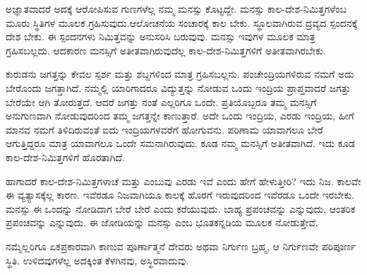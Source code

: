  ಅಜ್ಞಾತವಾದರೆ ಅದಕ್ಕೆ ಆರೋಪಿಸುವ ಗುಣಗಳೆಲ್ಲ ನಮ್ಮ ಮನಸ್ಸು ಕೊಟ್ಟದ್ದೇ. ಮನಸ್ಸು ಕಾಲ-ದೇಶ-ನಿಮಿತ್ತಗಳೆಂಬ ಮೂರು ಸ್ಥಿತಿಗಳ ಮೂಲಕ ಗ್ರಹಿಸುವುದು.\break ಆಲೋಚನೆಯ ಸಂಚಾರಕ್ಕೆ ಕಾಲ ಬೇಕು. ಸ್ಥೂಲವಾಗಿರುವ ದ್ರವ್ಯದ ಸ್ಪಂದನಕ್ಕೆ ದೇಶ ಬೇಕು. ಈ ಸ್ಪಂದನಗಳು ನಿಮಿತ್ತವನ್ನು ಅನುಸರಿಸಿ ಬರುವುವು. ಮನಸ್ಸು ಇವುಗಳ ಮೂಲಕ ಮಾತ್ರ ಗ್ರಹಿಸಬಲ್ಲದು. ಆದಕಾರಣ ಮನಸ್ಸಿಗೆ ಅತೀತವಾಗಿರುವುದೆಲ್ಲ ಕಾಲ-ದೇಶ-ನಿಮಿತ್ತಗಳಿಗೆ ಅತೀತವಾಗಿರಬೇಕು.

\newpage

ಕುರುಡನು ಜಗತ್ತನ್ನು ಕೇವಲ ಸ್ಪರ್ಶ ಮತ್ತು ಶಬ್ದಗಳಿಂದ ಮಾತ್ರ ಗ್ರಹಿಸಬಲ್ಲನು. ಪಂಚೇಂದ್ರಿಯಗಳಿರುವ ನಮಗೆ ಅದು ಬೇರೊಂದು ಜಗತ್ತಾಗಿದೆ. ನಮ್ಮಲ್ಲಿ ಯಾರಿಗಾದರೂ ವಿದ್ಯುತ್ತನ್ನು ನೋಡುವ ಒಂದು ಇಂದ್ರಿಯ ಪ್ರಾಪ್ತವಾದರೆ ಜಗತ್ತು ಬೇರೆಯೇ ಆಗಿ ತೋರುತ್ತದೆ. ಆದರೆ ಜಗತ್ತು  ನಂತೆ ಎಲ್ಲರಿಗೂ ಒಂದೇ. ಪ್ರತಿಯೊಬ್ಬರೂ ತಮ್ಮ ಮನಸ್ಸಿಗೆ ಅನುಗುಣವಾಗಿ ನೋಡುವುದರಿಂದ ತಮ್ಮ ಜಗತ್ತನ್ನೇ ಕಾಣುತ್ತಾರೆ. ಅದೇ  ಒಂದು ಇಂದ್ರಿಯ,  ಎರಡು ಇಂದ್ರಿಯ, ಹೀಗೆ ಮಾನವ ನಮಗೆ ತಿಳಿದಿರುವಂತೆ ಐದು ಇಂದ್ರಿಯಗಳವರೆಗೆ ಹೋಗುವನು. ಪರಿಣಾಮ ಯಾವಾಗಲೂ ಬೇರೆ ಆಗುತ್ತಿದ್ದರೂ  ಮಾತ್ರ ಯಾವಾಗಲೂ ಒಂದೇ ಸಮನಾಗಿರುವುದು.  ಕೂಡ ನಮ್ಮ ಮನಸ್ಸಿಗೆ ಅತೀತವಾಗಿದೆ. ಇದು ಕೂಡ ಕಾಲ-ದೇಶ-ನಿಮಿತ್ತಗಳಿಗೆ ಹೊರತಾಗಿದೆ.

ಹಾಗಾದರೆ ಕಾಲ-ದೇಶ-ನಿಮಿತ್ತಗಳಾಚೆ  ಮತ್ತು  ಎಂಬುವು ಎರಡು ಇವೆ ಎಂದು ಹೇಗೆ ಹೇಳುತ್ತೀರಿ? ಇದು ನಿಜ. ಕಾಲವೇ ಈ ವ್ಯತ್ಯಾಸಕ್ಕೆಲ್ಲ ಕಾರಣ. ಇವೆರಡೂ ನಿಜವಾಗಿಯೂ ಕಾಲಕ್ಕೆ ಹೊರಗೆ ಇರುವುದರಿಂದ ಇವೆರಡೂ ಒಂದೇ ಇರಬೇಕು. ಮನಸ್ಸು ಈ ಒಂದನ್ನು ನೋಡಿದಾಗ ಬೇರೆ ಬೇರೆ ಎಂದು ಕರೆಯುವುದು. ಬಾಹ್ಯ ಪ್ರಪಂಚವನ್ನು  ಎನ್ನುವುದು, ಆಂತರಿಕ ಪ್ರಪಂಚವನ್ನು  ಎನ್ನುವುದು. ಈ ಜೋಡಿಯನ್ನು ಮನಸ್ಸು ಎಂಬ ಭೂತಕನ್ನಡಿಯ ಮೂಲಕ ನೋಡುತ್ತೇವೆ.

ನಮ್ಮೆಲ್ಲರಿಗೂ ಏಕಪ್ರಕಾರವಾಗಿ ಕಾಣುವ ಪೂರ್ಣಾತ್ಮನೆ ದೇವರು ಅಥವಾ ನಿರ್ಗುಣ ಬ್ರಹ್ಮ, ಆ ನಿರ್ಗುಣವೇ ಪರಿಪೂರ್ಣ ಸ್ಥಿತಿ. ಉಳಿದವುಗಳೆಲ್ಲ ಅದಕ್ಕಿಂತ ಕೆಳಗಿನವು, ಅಸ್ಥಿರವಾದುವು.

